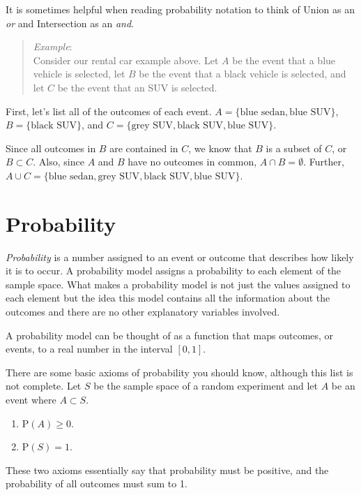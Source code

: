 \documentclass[
]{book}
\begin{document}
It is sometimes helpful when reading probability notation to think of Union as an \emph{or} and Intersection as an \emph{and}.

\begin{quote}
\emph{Example}:\\
Consider our rental car example above. Let \(A\) be the event that a blue vehicle is selected, let \(B\) be the event that a black vehicle is selected, and let \(C\) be the event that an SUV is selected.
\end{quote}

First, let's list all of the outcomes of each event. \(A = \{\mbox{blue sedan},\mbox{blue SUV}\}\), \(B=\{\mbox{black SUV}\}\), and \(C= \{\mbox{grey SUV}, \mbox{black SUV}, \mbox{blue SUV}\}\).

Since all outcomes in \(B\) are contained in \(C\), we know that \(B\) is a subset of \(C\), or \(B\subset C\). Also, since \(A\) and \(B\) have no outcomes in common, \(A \cap B = \emptyset\). Further, \(A \cup C = \{\mbox{blue sedan}, \mbox{grey SUV}, \mbox{black SUV}, \mbox{blue SUV}\}\).

\hypertarget{probability}{%
\section{Probability}\label{probability}}

\emph{Probability} is a number assigned to an event or outcome that describes how likely it is to occur. A probability model assigns a probability to each element of the sample space. What makes a probability model is not just the values assigned to each element but the idea this model contains all the information about the outcomes and there are no other explanatory variables involved.

A probability model can be thought of as a function that maps outcomes, or events, to a real number in the interval \([0,1]\).

There are some basic axioms of probability you should know, although this list is not complete. Let \(S\) be the sample space of a random experiment and let \(A\) be an event where \(A\subset S\).

\begin{enumerate}
\def\labelenumi{\arabic{enumi})}
\item
  \(\mbox{P}(A) \geq 0\).
\item
  \(\mbox{P}(S) = 1\).
\end{enumerate}

These two axioms essentially say that probability must be positive, and the probability of all outcomes must sum to 1.
\end{document}
